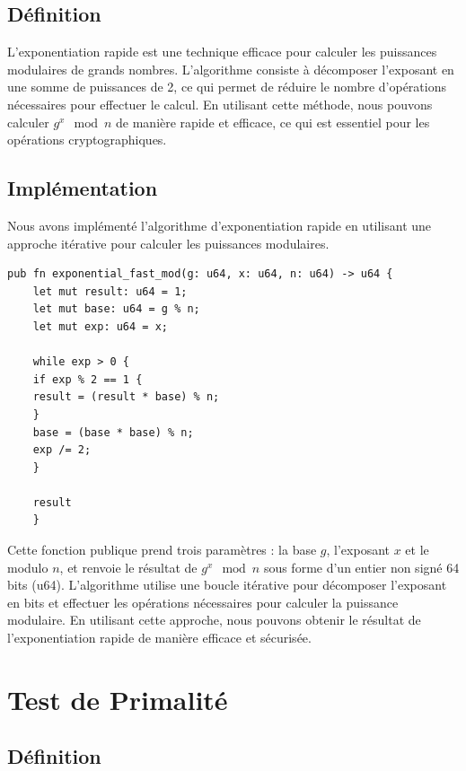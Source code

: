 \documentclass[11pt]{article}
\begin{document}
    \subsection{Définition}\label{subsec:definition}

    L'exponentiation rapide est une technique efficace pour calculer les puissances modulaires de grands nombres.
    L'algorithme consiste à décomposer l'exposant en une somme de puissances de 2, ce qui permet de réduire le nombre d'opérations nécessaires pour effectuer le calcul.
    En utilisant cette méthode, nous pouvons calculer $g^x \mod n$ de manière rapide et efficace, ce qui est essentiel pour les opérations cryptographiques.

    \subsection{Implémentation}\label{subsec:implementation}

    Nous avons implémenté l'algorithme d'exponentiation rapide en utilisant une approche itérative pour calculer les puissances modulaires.

    \lstset{language=Rust}
    \begin{lstlisting}[caption={Fonction d'exponentiation rapide (Rust)}, label={lst:rust_exponential_fast_mod}]
    pub fn exponential_fast_mod(g: u64, x: u64, n: u64) -> u64 {
    let mut result: u64 = 1;
    let mut base: u64 = g % n;
    let mut exp: u64 = x;

    while exp > 0 {
    if exp % 2 == 1 {
    result = (result * base) % n;
    }
    base = (base * base) % n;
    exp /= 2;
    }

    result
    }
\end{lstlisting}

Cette fonction publique prend trois paramètres : la base $g$, l'exposant $x$ et le modulo $n$, et renvoie le résultat de $g^x \mod n$ sous forme d'un entier non signé 64 bits (u64).
L'algorithme utilise une boucle itérative pour décomposer l'exposant en bits et effectuer les opérations nécessaires pour calculer la puissance modulaire.
En utilisant cette approche, nous pouvons obtenir le résultat de l'exponentiation rapide de manière efficace et sécurisée.


\section{Test de Primalité}\label{sec:test-de-primalite}

\subsection{Définition}\label{subsec:definition}
\end{document}
